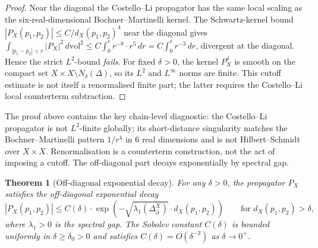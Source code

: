 \documentclass[11pt]{article}
\providecommand{\dbar}{\bar{\partial}}
\newtheorem{theorem}{Theorem}
\theoremstyle{definition}\newtheorem{definition}[theorem]{Definition}
\theoremstyle{remark}\newtheorem{remark}[theorem]{Remark}\newtheorem{example}[theorem]{Example}
\begin{document}
\begin{proof}
Near the diagonal the Costello--Li propagator has the same local
scaling as the six-real-dimensional Bochner--Martinelli kernel. The
Schwartz-kernel bound
$|P_X(p_1,p_2)|\leq C/d_X(p_1,p_2)^4$ near the diagonal gives
$\int_{|p_1-p_2|<r}|P_X|^2\,d\mathrm{vol}^2\leq C\int_0^r r^{-8}\cdot r^5\,dr
= C\int_0^r r^{-3}\,dr$, divergent at the diagonal. Hence the strict
$L^2$-bound \emph{fails}. For fixed $\delta>0$, the kernel
$P_X^\delta$ is smooth on the compact set
$X\times X\setminus N_\delta(\Delta)$, so its $L^2$ and $L^\infty$
norms are finite. This cutoff estimate is not itself a renormalised
finite part; the latter requires the Costello--Li local counterterm
subtraction.
\end{proof}

The proof above contains the key chain-level diagnostic: the
Costello--Li propagator is not $L^2$-finite globally; its short-distance
singularity matches the Bochner--Martinelli pattern $1/r^4$ in
$6$ real dimensions and is not Hilbert--Schmidt over $X\times X$.
Renormalisation is a counterterm construction, not the act of imposing
a cutoff. The off-diagonal part decays exponentially by spectral gap.

\begin{theorem}[Off-diagonal exponential decay]
\label{thm:propagator-off-diagonal-decay}
For any $\delta > 0$, the propagator $P_X$ satisfies the off-diagonal
exponential decay
\begin{equation}
\label{eq:propagator-decay}
|P_X(p_1,p_2)| \leq C(\delta)\cdot \exp(-\sqrt{\lambda_1(\Delta_{\dbar}^X)}\cdot d_X(p_1,p_2))
\qquad\text{for } d_X(p_1,p_2) > \delta,
\end{equation}
where $\lambda_1 > 0$ is the spectral gap. The Sobolev constant
$C(\delta)$ is bounded uniformly in $\delta\geq \delta_0 > 0$ and
satisfies $C(\delta) = O(\delta^{-3})$ as $\delta\to 0^+$.
\end{theorem}
\end{document}
